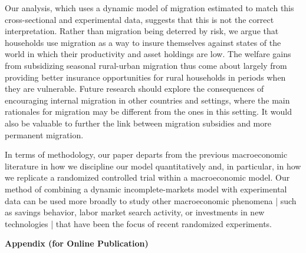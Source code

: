 \documentclass[12pt,pdftex]{article}
\def\thesection{\arabic{section}}
\def\thesubsection{\arabic{section}.\arabic{subsection}}
\def\thesubsubsection{\arabic{section}.\arabic{subsection}.\Alph{subsubsection}}
\begin{document}
Our analysis, which uses a dynamic model of migration estimated to match this cross-sectional and experimental data, suggests that this is not the correct interpretation.  Rather than migration being deterred by risk, we argue that households use migration as a way to insure themselves against states of the world in which their productivity and asset holdings are low. The welfare gains from subsidizing seasonal rural-urban migration thus come about largely from providing better insurance opportunities for rural households in periods when they are vulnerable. Future research should explore the consequences of encouraging internal migration in other countries and settings, where the main rationales for migration may be different from the ones in this setting. It would also be valuable to further the link between migration subsidies and more permanent migration.

In terms of methodology, our paper departs from the previous macroeconomic literature in how we discipline our model quantitatively and, in particular, in how we replicate a randomized controlled trial within a macroeconomic model. Our method of combining a dynamic incomplete-markets model with experimental data can be used more broadly to study other macroeconomic phenomena | such as savings behavior, labor market search activity, or investments in new technologies | that have been the focus of recent randomized experiments.



%
%






\appendix

\clearpage
\newpage

\begin{center}
\textbf{\Large Appendix (for Online Publication)}
\end{center}

\setcounter{section}{0}
\setcounter{figure}{0}
\setcounter{table}{0}
\renewcommand\thefigure{\thesection.\arabic{figure}}
\renewcommand{\thetable}{\thesection.\arabic{table}}
\renewcommand{\thesubsubsection}{\thesubsection.\arabic{subsubsection}}
\renewcommand{\thesubsection}{\thesection.\arabic{subsection}}
\end{document}
